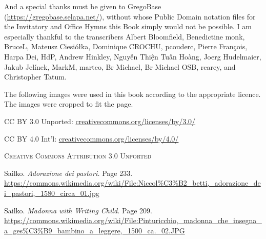 \par\noindent
And a special thanks must be given to GregoBase (\url{https://gregobase.selapa.net/}), without whose Public Domain notation files for the Invitatory and Office Hymns this Book simply would not be possible. I am especially thankful to the transcribers Albert Bloomfield, Benedictine monk, BruceL, Mateusz Ciesiółka, Dominique CROCHU, pcouderc, Pierre François, Harpa Dei, HdP, Andrew Hinkley, Nguyễn Thiện Tuấn Hoàng, Joerg Hudelmaier, Jakub Jelínek, MarkM, marteo, Br Michael, Br Michael OSB, rcarey, and Christopher Tatum.


\clearpage

\begin{FlushLeft}

The following images were used in this book according to the appropriate licence. The images were cropped to fit the page.

\vspace{1\baselineskip}

\par\noindent
CC BY 3.0 Unported: \url{creativecommons.org/licenses/by/3.0/}
\par\noindent
CC BY 4.0 Int'l: \url{creativecommons.org/licenses/by/4.0/}

\vspace{1\baselineskip}

\par\noindent
\centerline{\textsc{Creative Commons Attribution 3.0 Unported}}

Sailko. \textit{Adorazione dei pastori.} Page 233. \url{https://commons.wikimedia.org/wiki/File:Niccol\%C3\%B2_betti,_adorazione_dei_pastori,_1580_circa_01.jpg}

Sailko. \textit{Madonna with Writing Child.} Page 209. \url{https://commons.wikimedia.org/wiki/File:Pinturicchio,_madonna_che_insegna_a_ges\%C3\%B9_bambino_a_leggere,_1500_ca._02.JPG}


\vspace{0.5\baselineskip}


\end{FlushLeft}
